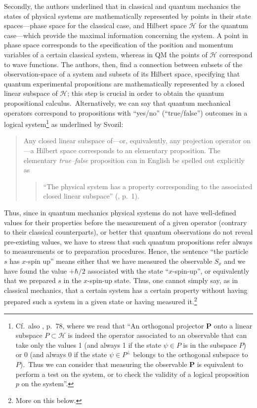 \documentclass[11pt, executivepaper]{article}
\begin{document}
Secondly, the authors underlined that in classical and quantum mechanics the states of physical systems are mathematically represented by points in their state spaces---phase space for the classical case, and Hilbert space $\mathcal{H}$ for the quantum case---which provide the maximal information concerning the system. A point in phase space corresponds to the specification of the position and momentum variables of a certain classical system, whereas in QM the points of $\mathcal{H}$ correspond to wave functions. The authors, then, find a connection between subsets of the observation-space of a system and subsets of its Hilbert space, specifying that quantum experimental propositions are mathematically represented by a closed linear subspace of $\mathcal{H}$; this step is crucial in order to obtain the quantum propositional calculus.\ Alternatively, we can say that quantum mechanical operators correspond to propositions with ``yes/no'' (``true/false'') outcomes in a logical system\footnote{Cf.\ also \cite{David:2015}, p.\ 78, where we read that ``An orthogonal projector $\textbf{P}$ onto a linear subspace $P\subset\mathcal{H}$ is indeed the operator associated to an observable that can take only the values 1 (and always 1 if the state $\psi\in P$ is in the subspace $P$) or 0 (and always 0 if the state $\psi\in P^{\perp}$ belongs to the orthogonal subspace to $P$).\ Thus we can consider that measuring the observable $\textbf{P}$ is equivalent to perform a test on the system, or to check the validity of a logical proposition $p$ on the system''.} as underlined by Svozil:
\begin{quote}
Any closed linear subspace of---or, equivalently, any projection operator on---a Hilbert space corresponds to an elementary
proposition. The elementary \emph{true--false} proposition can in English be spelled out explicitly as
\begin{quote}
``The physical system has a property corresponding to the associated closed linear subspace'' (\cite{Svozil:1999}, p.\ 1).
\end{quote}
\end{quote}

Thus, since in quantum mechanics physical systems do not have well-defined values for their properties before the measurement of a given operator (contrary to their classical counterparts), or better that quantum observations do not reveal pre-existing values, we have to stress that such quantum propositions refer always to measurements or to preparation procedures. Hence, the sentence ``the particle $s$ has $x$-spin up'' means either that we have measured the observable $S_x$ and we have found the value $+\hbar/2$ associated with the state ``$x$-spin-up'', or equivalently that we prepared $s$ in the $x$-spin-up state. Thus, one cannot simply say, as in classical mechanics, that a certain system has a certain property without having prepared such a system in a given state or having measured it.\footnote{More on this below.}
\end{document}
